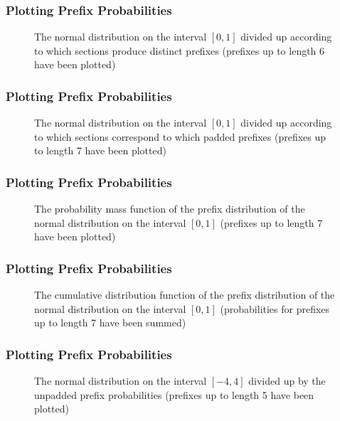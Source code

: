 \documentclass{beamer}
\begin{document}
\begin{frame}
\frametitle{Plotting Prefix Probabilities}
\begin{figure}
    \centering
    \scalebox{0.77}{}
    \caption{The normal distribution on the interval $[0,1]$ divided up according to which sections produce distinct prefixes (prefixes up to length 6 have been plotted)}
    \label{fig:normal_bin_cover}
\end{figure}
\end{frame}

\begin{frame}
\frametitle{Plotting Prefix Probabilities}
\begin{figure}
    \centering
    \scalebox{0.77}{}
    \caption{The normal distribution on the interval $[0,1]$ divided up according to which sections correspond to which padded prefixes (prefixes up to length 7 have been plotted)}
    \label{fig:normal_bin_cover_padded}
\end{figure}
\end{frame}

\begin{frame}
\frametitle{Plotting Prefix Probabilities}
\begin{figure}
    \centering
    \scalebox{0.77}{}
    \caption{The probability mass function of the prefix distribution of the normal distribution on the interval $[0,1]$ (prefixes up to length 7 have been plotted)}
    \label{fig:normal_bin_pmf}
\end{figure}
\end{frame}

\begin{frame}
\frametitle{Plotting Prefix Probabilities}
\begin{figure}
    \centering
    \scalebox{0.77}{}
    \caption{The cumulative distribution function of the prefix distribution of the normal distribution on the interval $[0,1]$ (probabilities for prefixes up to length 7 have been summed)}
    \label{fig:normal_bin_cdf}
\end{figure}
\end{frame}

\begin{frame}
\frametitle{Plotting Prefix Probabilities}
\begin{figure}
    \centering
    \scalebox{0.77}{}
    \caption{The normal distribution on the interval $[-4,4]$ divided up by the unpadded prefix probabilities (prefixes up to length 5 have been plotted)}
    \label{fig:normal_bin_cover_full}\vspace{2em}
\end{figure}
\end{frame}
\end{document}
